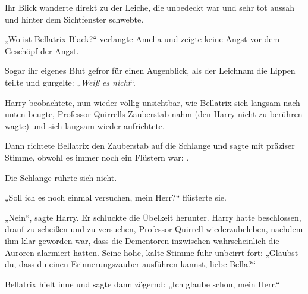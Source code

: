 Ihr Blick wanderte direkt zu der Leiche, die unbedeckt war und sehr tot aussah und hinter dem Sichtfenster schwebte.

„Wo ist Bellatrix Black?“ verlangte Amelia und zeigte keine Angst vor dem Geschöpf der Angst.

Sogar ihr eigenes Blut gefror für einen Augenblick, als der Leichnam die Lippen teilte und gurgelte:
„\emph{Weiß} \emph{es nicht}“.

\later

Harry beobachtete, nun wieder völlig unsichtbar, wie Bellatrix sich langsam nach unten beugte, Professor Quirrells Zauberstab nahm (den Harry nicht zu berühren wagte) und sich langsam wieder aufrichtete.

Dann richtete Bellatrix den Zauberstab auf die Schlange und sagte mit präziser Stimme, obwohl es immer noch ein Flüstern war: .

Die Schlange rührte sich nicht.

„Soll ich es noch einmal versuchen, mein Herr?“ flüsterte sie.

„Nein“, sagte Harry. Er schluckte die Übelkeit herunter. Harry hatte beschlossen, drauf zu scheißen und zu versuchen, Professor Quirrell wiederzubeleben, nachdem ihm klar geworden war, dass die Dementoren inzwischen wahrscheinlich die Auroren alarmiert hatten. Seine hohe, kalte Stimme fuhr unbeirrt fort:
„Glaubst du, dass du einen Erinnerungszauber ausführen kannst, liebe Bella?“

Bellatrix hielt inne und sagte dann zögernd:
„Ich glaube schon, mein Herr.“


